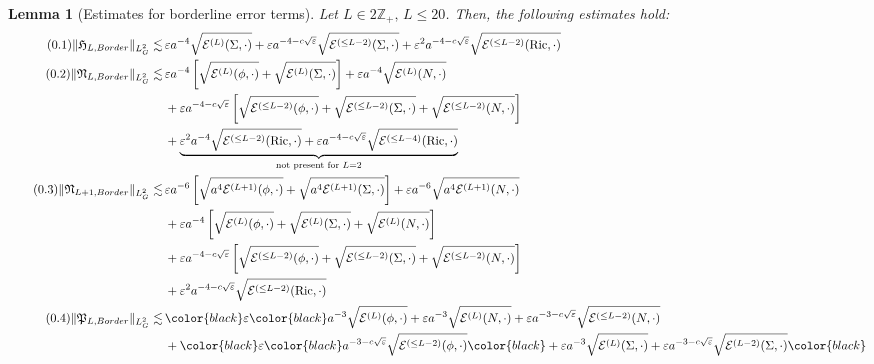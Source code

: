 \documentclass[11pt,leqno,textwidth=10cm]{amsart}
\numberwithin{equation}{section}
\theoremstyle{definition}
\theoremstyle{plain}
\newtheorem{lemma}[definition]{Lemma}
\newcommand{\1}{\mathbbm{1}}
\newcommand{\E}{\mathcal{E}}
\newcommand{\Ric}{\text{\normalfont{Ric}}}
\newcommand{\Z}{\mathbb{Z}}
\renewcommand{\epsilon}{\varepsilon}
\newcommand{\numberthis}{\addtocounter{equation}{1}\tag{\theequation}}
\renewcommand{\theequation}{\arabic{section}.\arabic{equation}}
\newcommand{\change}[1]{\color{black}#1\color{black}}
\begin{document}
\begin{lemma}[Estimates for borderline error terms] Let $L\in 2\Z_+,\,L\leq 20$. Then, the following estimates hold:
\begin{subequations}
\begin{align*}
\numberthis\label{eq:L2-Border-H}\|\mathfrak{H}_{L,Border}\|_{L^2_G}\lesssim&\,\epsilon a^{-4}\sqrt{\E^{(L)}(\Sigma,\cdot)}+\epsilon a^{-4-c\sqrt{\epsilon}}\sqrt{\E^{(\leq L-2)}(\Sigma,\cdot)}+\epsilon^2a^{-4-c\sqrt{\epsilon}}\sqrt{\E^{(\leq L-2)}(\Ric,\cdot)}\\
\numberthis\label{eq:L2-Border-N}\|\mathfrak{N}_{L,Border}\|_{L^2_G}\lesssim&\,\epsilon a^{-4}\left[\sqrt{\E^{(L)}(\phi,\cdot)}+\sqrt{\E^{(L)}(\Sigma,\cdot)}\right]+\epsilon a^{-4}\sqrt{\E^{(L)}(N,\cdot)}\\
&\,+\epsilon a^{-4-c\sqrt{\epsilon}}\left[\sqrt{\E^{(\leq L-2)}(\phi,\cdot)}+\sqrt{\E^{(\leq L-2)}(\Sigma,\cdot)}+\sqrt{\E^{(\leq L-2)}(N,\cdot)}\right]\\
&\,+\underbrace{\epsilon^2 a^{-4}\sqrt{\E^{(\leq L-2)}(\Ric,\cdot)}+\epsilon a^{-4-c\sqrt{\epsilon}}\sqrt{\E^{(\leq L-4)}(\Ric,\cdot)}}_{\text{not present for }L=2}\\
\numberthis\label{eq:L2-Border-N-odd}\|\mathfrak{N}_{L+1,Border}\|_{L^2_G}\lesssim&\,\epsilon a^{-6}\left[\sqrt{a^4\E^{(L+1)}(\phi,\cdot)}+\sqrt{a^4\E^{(L+1)}(\Sigma,\cdot)}\right]+\epsilon a^{-6}\sqrt{a^4\E^{(L+1)}(N,\cdot)}\\
&\,+\epsilon a^{-4}\left[\sqrt{\E^{(L)}(\phi,\cdot)}+\sqrt{\E^{(L)}(\Sigma,\cdot)}+\sqrt{\E^{(L)}(N,\cdot)}\right]\\
&\,+\epsilon a^{-4-c\sqrt{\epsilon}}\left[\sqrt{\E^{(\leq L-2)}(\phi,\cdot)}+\sqrt{\E^{(\leq L-2)}(\Sigma,\cdot)}+\sqrt{\E^{(\leq L-2)}(N,\cdot)}\right]\\
&\,+\epsilon^2a^{-4-c\sqrt{\epsilon}}\sqrt{\E^{(\leq L-2)}(\Ric,\cdot)}\\
\numberthis\label{eq:L2-Border-P-even}\|\mathfrak{P}_{L,Border}\|_{L^2_G}\lesssim&\,%
\change{\epsilon}a^{-3}\sqrt{\E^{(L)}(\phi,\cdot)}+\epsilon a^{-3}\sqrt{\E^{(L)}(N,\cdot)}+\epsilon a^{-3-c\sqrt\epsilon}\sqrt{\E^{(\leq L-2)}(N,\cdot)}\\
&\,+%
\change{\epsilon}a^{-3-c\sqrt{\epsilon}}\sqrt{\E^{(\leq L-2)}(\phi,\cdot)}
\change{+\epsilon a^{-3}\sqrt{\E^{(L)}(\Sigma,\cdot)}+\epsilon a^{-3-c\sqrt{\epsilon}}\sqrt{\E^{(L-2)}(\Sigma,\cdot)}}\\

\end{align*}
\end{subequations}
\end{lemma}
\end{document}
